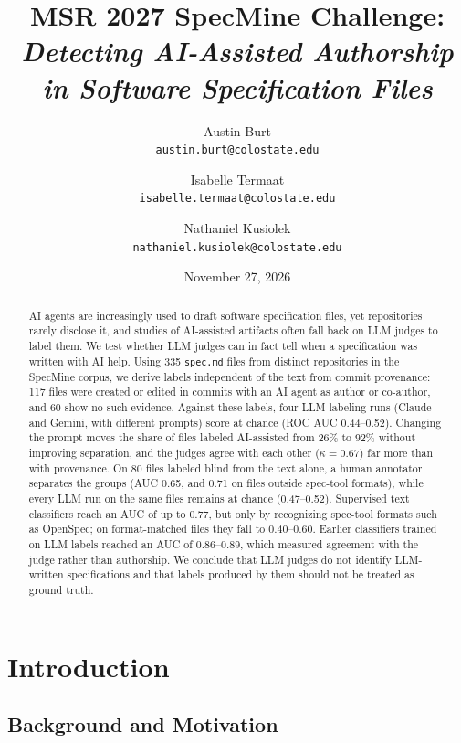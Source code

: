 \documentclass{article}
\title{\textbf{MSR 2027 SpecMine Challenge:} \\[0.4em] \textit{Detecting AI-Assisted Authorship in Software Specification Files}}
\author{
  Austin Burt \\
  \texttt{austin.burt@colostate.edu}
  \and
  Isabelle Termaat  \\
  \texttt{isabelle.termaat@colostate.edu}
  \and
  Nathaniel Kusiolek \\
  \texttt{nathaniel.kusiolek@colostate.edu}
}
\date{November 27, 2026}
\begin{document}
\maketitle

\begin{abstract}
AI agents are increasingly used to draft software specification files, yet repositories rarely disclose it, and studies of AI-assisted artifacts often fall back on LLM judges to label them. We test whether LLM judges can in fact tell when a specification was written with AI help. Using 335 \texttt{spec.md} files from distinct repositories in the SpecMine corpus, we derive labels independent of the text from commit provenance: 117 files were created or edited in commits with an AI agent as author or co-author, and 60 show no such evidence. Against these labels, four LLM labeling runs (Claude and Gemini, with different prompts) score at chance (ROC AUC 0.44--0.52). Changing the prompt moves the share of files labeled AI-assisted from 26\% to 92\% without improving separation, and the judges agree with each other ($\kappa = 0.67$) far more than with provenance. On 80 files labeled blind from the text alone, a human annotator separates the groups (AUC 0.65, and 0.71 on files outside spec-tool formats), while every LLM run on the same files remains at chance (0.47--0.52). Supervised text classifiers reach an AUC of up to 0.77, but only by recognizing spec-tool formats such as OpenSpec; on format-matched files they fall to 0.40--0.60. Earlier classifiers trained on LLM labels reached an AUC of 0.86--0.89, which measured agreement with the judge rather than authorship. We conclude that LLM judges do not identify LLM-written specifications and that labels produced by them should not be treated as ground truth.
\end{abstract}

\section{Introduction}
\subsection{Background and Motivation}
\end{document}
